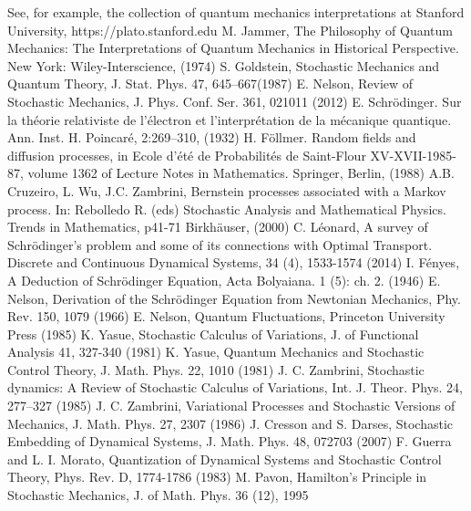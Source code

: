 \documentclass[%
 aip, 
 amsmath,amssymb,amsthm,
 nofootinbib,
 reprint,
]{revtex4-1}
\begin{document}
\begin{thebibliography}{}
%
%
 See, for example, the collection of quantum mechanics interpretations at Stanford University, https://plato.stanford.edu
M. Jammer, The Philosophy of Quantum Mechanics: The Interpretations of Quantum Mechanics in Historical Perspective. New York: Wiley-Interscience, (1974)
S. Goldstein, Stochastic Mechanics and Quantum Theory, J. Stat. Phys. 47, 645–667(1987)
 E. Nelson, Review of Stochastic Mechanics, J. Phys. Conf. Ser. 361, 021011 (2012)
E. Schr\"{o}dinger. Sur la th\'{e}orie relativiste de l’\'{e}lectron et l’interpr\'{e}tation de la m\'{e}canique quantique. Ann. Inst. H. Poincar\'{e}, 2:269–310, (1932)
H. F\"{o}llmer. Random fields and diffusion processes, in Ecole d’\'{e}t\'{e} de Probabilit\'{e}s de Saint-Flour XV-XVII-1985-87, volume 1362 of Lecture Notes in Mathematics. Springer, Berlin, (1988)
A.B. Cruzeiro, L. Wu, J.C. Zambrini, Bernstein processes associated with a Markov process. In: Rebolledo R. (eds) Stochastic Analysis and Mathematical Physics. Trends in Mathematics, p41-71 Birkh\"{a}user, (2000)
C. L\'{e}onard, A survey of Schr\"{o}dinger's problem and some of its connections with Optimal Transport. Discrete and Continuous Dynamical Systems, 34 (4), 1533-1574 (2014)
 I. F\'{e}nyes, A Deduction of Schrödinger Equation, Acta Bolyaiana. 1 (5): ch. 2. (1946)
 E. Nelson, Derivation of the Schr\"{o}dinger Equation from Newtonian Mechanics, Phy. Rev. 150, 1079 (1966)
E. Nelson, Quantum Fluctuations, Princeton University Press (1985)
K. Yasue, Stochastic Calculus of Variations, J. of Functional Analysis 41, 327-340 (1981)
K. Yasue, Quantum Mechanics and Stochastic Control Theory, J. Math. Phys. 22, 1010 (1981)
J. C. Zambrini, Stochastic dynamics: A Review of Stochastic Calculus of Variations, Int. J.  Theor. Phys. 24, 277–327 (1985)
J. C. Zambrini, Variational Processes and Stochastic Versions of Mechanics, J. Math. Phys. 27, 2307 (1986)
J. Cresson and S. Darses, Stochastic Embedding of Dynamical Systems, J. Math. Phys. 48, 072703 (2007)
F. Guerra and L. I. Morato, Quantization of Dynamical Systems and Stochastic Control Theory, Phys. Rev. D, 1774-1786 (1983)
M. Pavon, Hamilton's Principle in Stochastic Mechanics, J. of Math. Phys. 36 (12), 1995

\end{thebibliography}
\end{document}
